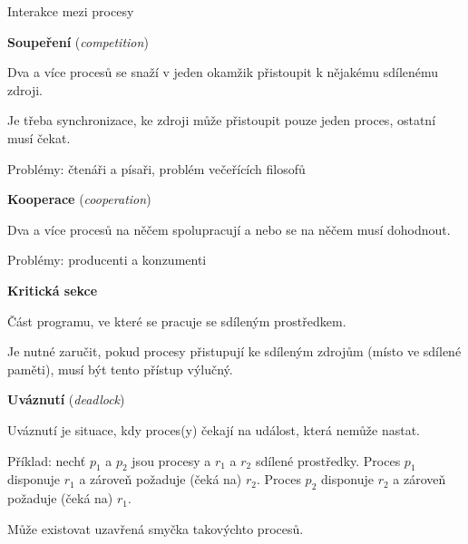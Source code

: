 \begin{compactitem}
    \item Interakce mezi procesy \begin{compactitem}
        \item \textbf{Soupeření} (\textit{competition}) \begin{compactitem}
            \item Dva a více procesů se snaží v jeden okamžik přistoupit k nějakému sdílenému zdroji.
            \item Je třeba synchronizace, ke zdroji může přistoupit pouze jeden proces, ostatní musí čekat.
            \item Problémy: čtenáři a písaři, problém večeřících filosofů
        \end{compactitem}

        \item \textbf{Kooperace} (\textit{cooperation}) \begin{compactitem}
            \item Dva a více procesů na něčem spolupracují a nebo se na něčem musí dohodnout.
            \item Problémy: producenti a konzumenti
        \end{compactitem}
    \end{compactitem}

    \item \textbf{Kritická sekce} \begin{compactitem}
        \item Část programu, ve které se pracuje se sdíleným prostředkem.
        \item Je nutné zaručit, pokud procesy přistupují ke sdíleným zdrojům (místo ve sdílené paměti), musí být tento přístup výlučný.
    \end{compactitem}

    \item \textbf{Uváznutí} (\textit{deadlock}) \begin{compactitem}
        \item Uváznutí je situace, kdy proces(y) čekají na událost, která nemůže nastat.
        \item Příklad: nechť $p_1$ a $p_2$ jsou procesy a $r_1$ a $r_2$ sdílené prostředky. Proces $p_1$ disponuje $r_1$ a zároveň požaduje (čeká na) $r_2$. Proces $p_2$ disponuje $r_2$ a zároveň požaduje (čeká na) $r_1$.
        \item Může existovat uzavřená smyčka takovýchto procesů.
    \end{compactitem}


\end{compactitem}
